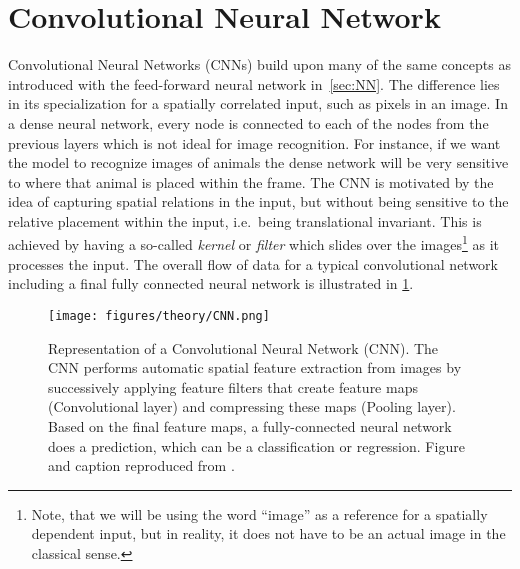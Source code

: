 \section{Convolutional Neural Network}\label{sec:CNN}
Convolutional Neural Networks (\acrshort{CNN}s) build upon many of the same
concepts as introduced with the feed-forward neural network in~\cref{sec:NN}.
The difference lies in its specialization for a spatially correlated input, such
as pixels in an image. In a dense neural network, every node is connected to
each of the nodes from the previous layers which is not ideal for image
recognition. For instance, if we want the model to recognize images of animals
the dense network will be very sensitive to where that animal is placed within
the frame. The \acrshort{CNN} is motivated by the idea of capturing spatial
relations in the input, but without being sensitive to the relative placement
within the input, i.e.\ being translational invariant. This is achieved by
having a so-called \textit{kernel} or \textit{filter} which slides over the
images\footnote{Note, that we will be using the word ``image'' as a reference
for a spatially dependent input, but in reality, it does not have to be an
actual image in the classical sense.} as it processes the input. The overall flow of data for a typical convolutional network including a final fully connected neural network is illustrated in \cref{fig:CNN}. 

\begin{figure}[!htb]
  \centering
  \texttt{[image: figures/theory/CNN.png]}
  \caption{Representation of a Convolutional Neural Network (\acrshort{CNN}). The \acrshort{CNN} performs automatic spatial feature extraction from images by successively applying feature filters that create feature maps (Convolutional layer) and compressing these maps (Pooling layer). Based on the final feature maps, a fully-connected neural network does a prediction, which can be a classification or regression. Figure and caption reproduced from \cite{cunha2022review}.}  
  \label{fig:CNN}
\end{figure}

